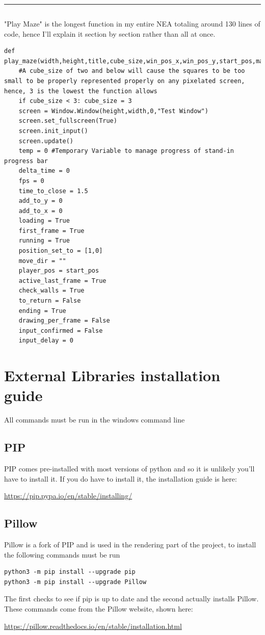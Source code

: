 \documentclass{article}
\begin{document}
\textcolor[RGB]{220,220,220}{\rule{\linewidth}{0.2pt}}
\begin{lstlisting}
\end{lstlisting}
"Play Maze" is the longest function in my entire NEA totaling around 130 lines of code, hence I'll explain it section by section rather than all at once.
\begin{lstlisting}
def play_maze(width,height,title,cube_size,win_pos_x,win_pos_y,start_pos,maze_data):
    #A cube_size of two and below will cause the squares to be too small to be properly represented properly on any pixelated screen, hence, 3 is the lowest the function allows
    if cube_size < 3: cube_size = 3 
    screen = Window.Window(height,width,0,"Test Window")
    screen.set_fullscreen(True)
    screen.init_input()
    screen.update()
    temp = 0 #Temporary Variable to manage progress of stand-in progress bar
    delta_time = 0
    fps = 0
    time_to_close = 1.5
    add_to_y = 0
    add_to_x = 0
    loading = True
    first_frame = True
    running = True
    position_set_to = [1,0]
    move_dir = ""
    player_pos = start_pos
    active_last_frame = True
    check_walls = True
    to_return = False
    ending = True
    drawing_per_frame = False
    input_confirmed = False
    input_delay = 0
\end{lstlisting}



\clearpage
\section{External Libraries installation guide}
All commands must be run in the windows command line
\subsection{PIP}
PIP comes pre-installed with most versions of python and so it is unlikely you'll have to install it. If you do have to install it, the installation guide is here: 
\begin{center}
\url{https://pip.pypa.io/en/stable/installing/}
\end{center}
\subsection{Pillow}
Pillow is a fork of PIP and is used in the rendering part of the project, to install the following commands must be run
\begin{lstlisting}
python3 -m pip install --upgrade pip
python3 -m pip install --upgrade Pillow
\end{lstlisting}
The first checks to see if pip is up to date and the second actually installs Pillow. These commands come from the Pillow website, shown here:
\begin{center}
\url{https://pillow.readthedocs.io/en/stable/installation.html}
\end{center}
\end{document}
